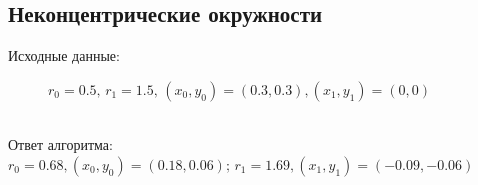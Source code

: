 \documentclass[12pt,twoside]{article}
\begin{document}
\subsection{Неконцентрические окружности}
Исходные данные: \\
\begin{figure}[h]
\caption{$r_0 = 0.5, \, r_1 = 1.5, \, (x_0, y_0) = (0.3, 0.3), (x_1, y_1) = (0, 0)$}
\end{figure} \\
Ответ алгоритма: $r_0 = 0.68, (x_0, y_0) = (0.18, 0.06); \, r_1 = 1.69, (x_1, y_1) = (-0.09, -0.06) $
\begin{figure}[h]
\end{figure}\\
\end{document}
